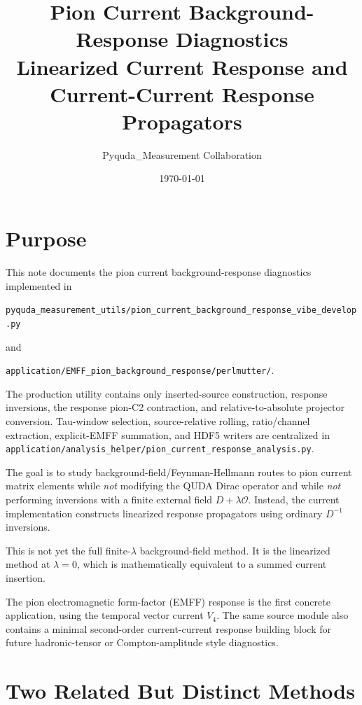 \documentclass[11pt,a4paper]{article}
\title{\textbf{Pion Current Background-Response Diagnostics}\\[4pt]
\large Linearized Current Response and Current-Current Response Propagators}
\author{Pyquda\_Measurement Collaboration}
\date{\today}
\newcommand{\Dslash}{D}
\newcommand{\Ocur}{\mathcal{O}}
\begin{document}
\maketitle
\tableofcontents

\section{Purpose}

This note documents the pion current background-response diagnostics implemented
in
\begin{center}
\texttt{pyquda\_measurement\_utils/pion\_current\_background\_response\_vibe\_develop.py}
\end{center}
and
\begin{center}
\texttt{application/EMFF\_pion\_background\_response/perlmutter/}.
\end{center}
The production utility contains only inserted-source construction, response
inversions, the response pion-C2 contraction, and relative-to-absolute
projector conversion. Tau-window selection, source-relative rolling,
ratio/channel extraction, explicit-EMFF summation, and HDF5 writers are
centralized in
\texttt{application/analysis\_helper/pion\_current\_response\_analysis.py}.

The goal is to study background-field/Feynman-Hellmann routes to pion current
matrix elements while \emph{not} modifying the QUDA Dirac operator and while
\emph{not} performing inversions with a finite external field
\(\Dslash+\lambda\Ocur\).  Instead, the current implementation constructs
linearized response propagators using ordinary \(\Dslash^{-1}\) inversions.

This is not yet the full finite-\(\lambda\) background-field method.  It is the
linearized method at \(\lambda=0\), which is mathematically equivalent to a
summed current insertion.

The pion electromagnetic form-factor (EMFF) response is the first concrete
application, using the temporal vector current \(V_4\).  The same source module
also contains a minimal second-order current-current response building block for
future hadronic-tensor or Compton-amplitude style diagnostics.

\section{Two Related But Distinct Methods}
\end{document}

